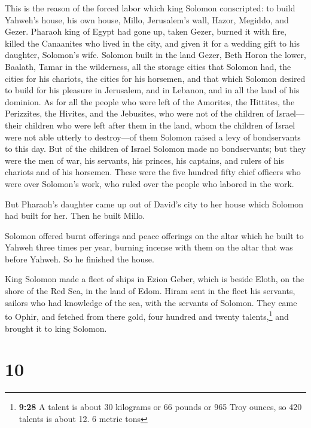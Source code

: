  This is the reason of the forced labor which king
Solomon conscripted: to build Yahweh's house, his own house, Millo,
Jerusalem's wall, Hazor, Megiddo, and Gezer.  Pharaoh
king of Egypt had gone up, taken Gezer, burned it with fire, killed the
Canaanites who lived in the city, and given it for a wedding gift to his
daughter, Solomon's wife.  Solomon built in the land
Gezer, Beth Horon the lower,  Baalath, Tamar in the
wilderness,  all the storage cities that Solomon had, the
cities for his chariots, the cities for his horsemen, and that which
Solomon desired to build for his pleasure in Jerusalem, and in Lebanon,
and in all the land of his dominion.  As for all the
people who were left of the Amorites, the Hittites, the Perizzites, the
Hivites, and the Jebusites, who were not of the children of Israel---
 their children who were left after them in the land,
whom the children of Israel were not able utterly to destroy---of them
Solomon raised a levy of bondservants to this day.  But
of the children of Israel Solomon made no bondservants; but they were
the men of war, his servants, his princes, his captains, and rulers of
his chariots and of his horsemen.  These were the five
hundred fifty chief officers who were over Solomon's work, who ruled
over the people who labored in the work.

 But Pharaoh's daughter came up out of David's city to
her house which Solomon had built for her. Then he built Millo.

 Solomon offered burnt offerings and peace offerings on
the altar which he built to Yahweh three times per year, burning incense
with them on the altar that was before Yahweh. So he finished the house.

 King Solomon made a fleet of ships in Ezion Geber, which
is beside Eloth, on the shore of the Red Sea, in the land of Edom.
 Hiram sent in the fleet his servants, sailors who had
knowledge of the sea, with the servants of Solomon.  They
came to Ophir, and fetched from there gold, four hundred and twenty
talents,\footnote{\textbf{9:28} A talent is about 30 kilograms or 66
  pounds or 965 Troy ounces, so 420 talents is about 12. 6 metric tons}
and brought it to king Solomon.

\hypertarget{section-9}{%
\section{10}\label{section-9}}

